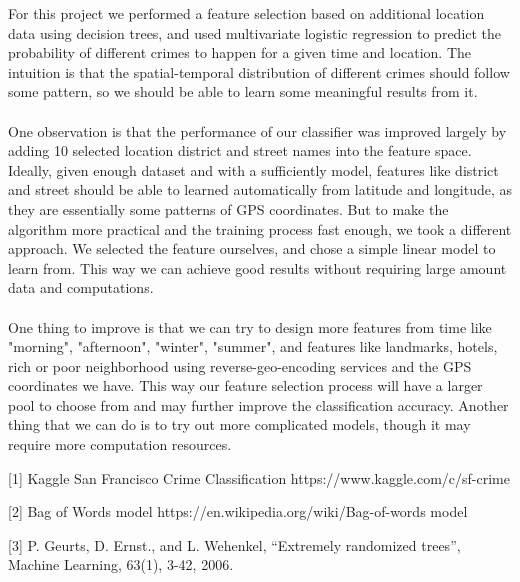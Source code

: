 \documentclass[12pt]{article}
\newenvironment{p5}[2][Part VI Discussion and Future Work]{\begin{trivlist}
\item[\hskip \labelsep {\bfseries #1}\hskip \labelsep {\bfseries #2}]}{\end{trivlist}}
\newenvironment{p6}[2][References]{\begin{trivlist}
\item[\hskip \labelsep {\bfseries #1}\hskip \labelsep {\bfseries #2}]}{\end{trivlist}}
\begin{document}
\newpage
\begin{p5}{}
\item{}
For this project we performed a feature selection based on additional location data using decision trees, and used multivariate logistic regression to predict the probability of different crimes to happen for a given time and location. The intuition is that the spatial-temporal distribution of different crimes should follow some pattern, so we should be able to learn some meaningful results from it.\\\\
One observation is that the performance of our classifier was improved largely by adding 10 selected location district and street names into the feature space. Ideally, given enough dataset and with a sufficiently model, features like district and street should be able to learned automatically from latitude and longitude, as they are essentially some patterns of GPS coordinates. But to make the algorithm more practical and the training process fast enough, we took a different approach. We selected the feature ourselves, and chose a simple linear model to learn from. This way we can achieve good results without requiring large amount data and computations.\\\\
One thing to improve is that we can try to design more features from time like "morning", "afternoon", "winter", "summer", and features like landmarks, hotels, rich or poor neighborhood using reverse-geo-encoding services and the GPS coordinates we have. This way our feature selection process will have a larger pool to choose from and may further improve the classification accuracy. Another thing that we can do is to try out more complicated models, though it may require more computation resources.
\end{p5}{}
\begin{p6}{}
\item{}
[1] Kaggle San Francisco Crime Classification https://www.kaggle.com/c/sf-crime
\item{}
[2] Bag of Words model https://en.wikipedia.org/wiki/Bag-of-words model 
\item{}
[3] P. Geurts, D. Ernst., and L. Wehenkel, ``Extremely randomized trees'', Machine Learning, 63(1), 3-42, 2006.

\end{p6}

 
\end{document}
